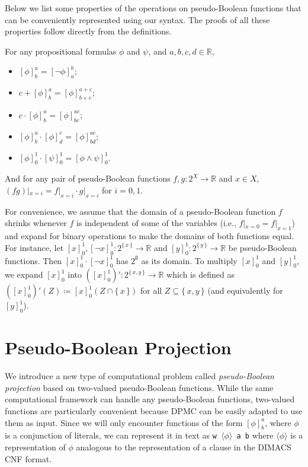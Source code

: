 Below we list some properties of the operations on pseudo-Boolean functions that
can be conveniently represented using our syntax. The proofs of all these
properties follow directly from the definitions.

\begin{proposition}\label{prop:basic}
  For any propositional formulas $\phi$ and $\psi$, and
  $a, b, c, d \in \mathbb{R}$,
  \begin{itemize}
    \item ${[\phi]}^a_b = {[\neg \phi]}^b_a$\space\space;
    \item $c + {[\phi]}^a_b = {[\phi]}^{a+c}_{b+c}$\space\space;
    \item $c \cdot {[\phi]}^a_b = {[\phi]}^{ac}_{bc}$\space\space;
    \item ${[\phi]}^a_b \cdot {[\phi]}^c_d = {[\phi]}^{ac}_{bd}$\space\space;
    \item
          ${[\phi]}^1_0 \cdot {[\psi]}_0^1 = {[\phi \land \psi]}_0^1$\space\space.
  \end{itemize}
  And for any pair of pseudo-Boolean functions $f, g \colon 2^X \to \mathbb{R}$
  and $x \in X$, $(fg)|_{x=i} = f|_{x=i} \cdot g|_{x=i}$ for $i = 0, 1$.
\end{proposition}

\begin{remark}
  For convenience, we assume that the domain of a pseudo-Boolean function $f$
  shrinks whenever $f$ is independent of some of the variables (i.e.,
  $f|_{x=0} = f|_{x=1}$) and expand for binary operations to make the domains of
  both functions equal. For instance, let
  ${[x]}_0^1,{[\neg x]}_0^1\colon 2^{\{\, x \,\}} \to \mathbb{R}$ and
  ${[y]}_0^1\colon 2^{\{\, y \,\}} \to \mathbb{R}$ be pseudo-Boolean functions.
  Then ${[x]}_0^1 \cdot {[\neg x]}_0^1$ has $2^\emptyset$ as its domain. To
  multiply ${[x]}_0^1$ and ${[y]}_0^1$, we expand ${[x]}_0^1$ into
  $\left({[x]}_0^1\right)'\colon 2^{\{\, x, y \,\}} \to \mathbb{R}$ which is
  defined as
  $\left({[x]}_0^1\right)'(Z) \coloneqq {[x]}_0^1(Z \cap \{\, x \,\})$ for all
  $Z \subseteq \{\, x, y \,\}$ (and equivalently for ${[y]}_0^1$).
\end{remark}

\section{Pseudo-Boolean Projection}

We introduce a new type of computational problem called \emph{pseudo-Boolean
  projection} based on two-valued pseudo-Boolean functions. While the same
computational framework can handle any pseudo-Boolean functions, two-valued
functions are particularly convenient because \textsc{DPMC}
\citep{DBLP:conf/cp/DudekPV20} can be easily adapted to use them as input. Since
we will only encounter functions of the form ${[\phi]}^a_b$, where $\phi$ is a
conjunction of literals, we can represent it in text as \texttt{w
  $\langle\phi\rangle$ a b} where $\langle\phi\rangle$ is a representation of
$\phi$ analogous to the representation of a clause in the DIMACS CNF format.

